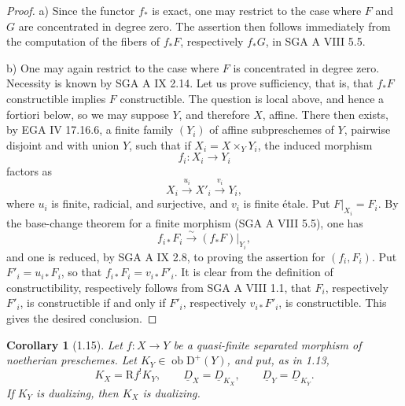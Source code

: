 \documentclass[11pt,a4paper]{article}
\newcommand{\D}{\mathrm{D}}
\newcommand{\ob}{\operatorname{ob}}
\newcommand{\Ddual}{\underline{D}}
\theoremstyle{plain}
\newtheorem*{corollarystar}{Corollary}
\theoremstyle{definition}
\begin{document}
\begin{proof}
a) Since the functor $f_*$ is exact, one may restrict to the case where $F$ and $G$ are concentrated in degree zero. The assertion then follows immediately from the computation of the fibers of $f_*F$, respectively $f_*G$, in SGA A VIII 5.5.

b) One may again restrict to the case where $F$ is concentrated in degree zero. Necessity is known by SGA A IX 2.14. Let us prove sufficiency, that is, that $f_*F$ constructible implies $F$ constructible. The question is local above, and hence a fortiori below, so we may suppose $Y$, and therefore $X$, affine. There then exists, by EGA IV 17.16.6, a finite family $(Y_i)$ of affine subpreschemes of $Y$, pairwise disjoint and with union $Y$, such that if $X_i=X\times_YY_i$, the induced morphism
\[
f_i:X_i\longrightarrow Y_i
\]
factors as
\[
X_i\xrightarrow{u_i}X'_i\xrightarrow{v_i}Y_i,
\]
where $u_i$ is finite, radicial, and surjective, and $v_i$ is finite étale. Put $F|_{X_i}=F_i$. By the base-change theorem for a finite morphism (SGA A VIII 5.5), one has
\[
f_{i*}F_i\xrightarrow{\sim}(f_*F)|_{Y_i},
\]
and one is reduced, by SGA A IX 2.8, to proving the assertion for $(f_i,F_i)$. Put $F'_i=u_{i*}F_i$, so that $f_{i*}F_i=v_{i*}F'_i$. It is clear from the definition of constructibility, respectively follows from SGA A VIII 1.1, that $F_i$, respectively $F'_i$, is constructible if and only if $F'_i$, respectively $v_{i*}F'_i$, is constructible. This gives the desired conclusion.
\end{proof}

\begin{corollarystar}[1.15]
Let $f:X\to Y$ be a quasi-finite separated morphism of noetherian preschemes. Let $K_Y\in\ob\D^+(Y)$, and put, as in 1.13,
\[
K_X=\mathrm Rf^!K_Y,
\qquad
\Ddual_X=\Ddual_{K_X},
\qquad
\Ddual_Y=\Ddual_{K_Y}.
\]
If $K_Y$ is dualizing, then $K_X$ is dualizing.
\end{corollarystar}
\end{document}
